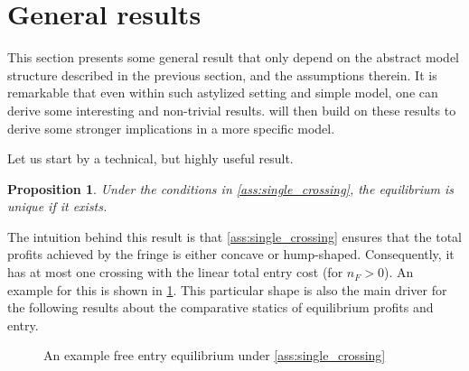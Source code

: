 \documentclass[a4paper]{article}
\newtheorem{proposition}{Proposition}
\begin{document}
\section{General results}

This section presents some general result that only depend on the abstract model structure described in the previous section, and the assumptions therein.
It is remarkable that even within such astylized setting and simple model, one can derive some interesting and non-trivial results.
 will then build on these results to derive some stronger implications in a more specific model.

Let us start by a technical, but highly useful result.
\begin{proposition}
    \label{prop:unique_equilibrium}
    Under the conditions in \cref{ass:single_crossing}, the equilibrium is unique if it exists.
\end{proposition}
The intuition behind this result is that \cref{ass:single_crossing} ensures that the total profits achieved by the fringe is either concave or hump-shaped.
Consequently, it has at most one crossing with the linear total entry cost (for $n_F > 0$).
An example for this is shown in \cref{fig:equilibrium}.
This particular shape is also the main driver for the following results about the comparative statics of equilibrium profits and entry.

\begin{figure}[ht]
    \centering
    \caption{An example free entry equilibrium under \cref{ass:single_crossing}}
    \label{fig:equilibrium}
\end{figure}
\end{document}
